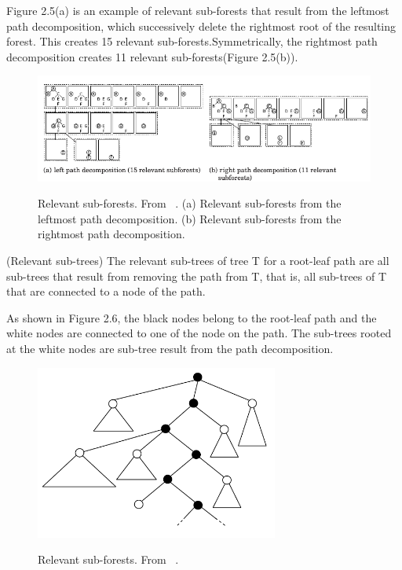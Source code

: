 Figure 2.5(a) is an example of relevant sub-forests that result from the leftmost path decomposition, which successively delete the rightmost root of the resulting forest. This creates 15 relevant sub-forests.Symmetrically, the rightmost path decomposition creates 11 relevant sub-forests(Figure 2.5(b)).

\begin{figure}
		\centering
		\includegraphics[width=16cm,clip]{Figures/PathDecomposition}
		\label{Relevant Sub-trees from the leftmost path decomposition and the rightmost path decomposition} 
		\caption{Relevant sub-forests. From ~\cite{pawlik2015efficient}. (a) Relevant sub-forests from the leftmost path decomposition. (b) Relevant sub-forests from the rightmost path decomposition.}
\end{figure}

\begin{definition}
(Relevant sub-trees)
The relevant sub-trees of tree T for a root-leaf path are all sub-trees that result from removing the path from T, that is, all sub-trees of T that are connected to a node of the path.  
\end{definition}

As shown in Figure 2.6, the black nodes belong to the root-leaf path and the white nodes are connected to one of the node on the path. The sub-trees rooted at the white nodes are sub-tree result from the path decomposition. 

\begin{figure}
		\centering
		\includegraphics[width=8cm,clip]{Figures/RelevantSubtrees}
		\label{Relevant Sub-trees from the path decomposition} 
		\caption{Relevant sub-forests. From ~\cite{demaine2009optimal}.}
\end{figure}

